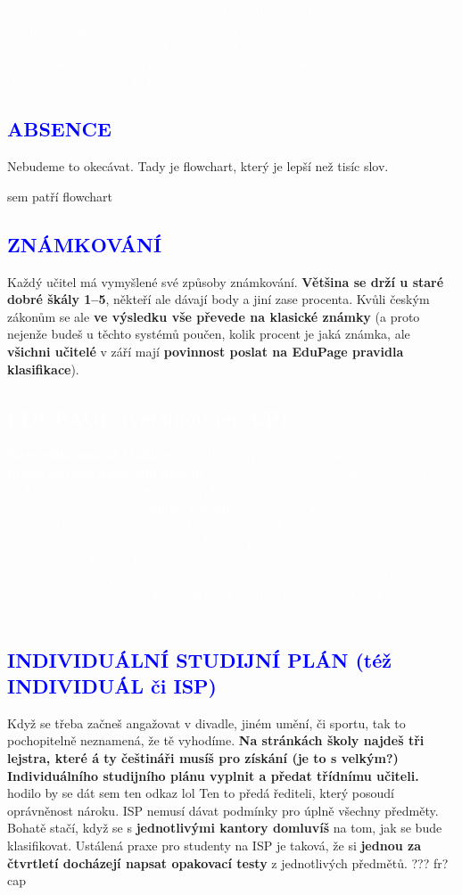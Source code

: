 \documentclass{article}
\newcommand{\podnadpisf}[1]{
  \subsection*{\textcolor{blue}{#1}}
}
\begin{document}
\begin{bluebox}
  \textcolor{white}{\footnotesize
  ‘v jídelně jsme si všichni rovni’ aneb jeden podpultový tip:\\
  v případě úplně nejhoršího scénáře, kdy si zapomeneš objednat jídlo a v burze nic není, můžeš zkusit dojít čtvrt hodiny před druhou a hodit na kuchařky psí oči, třeba ti něco dají. a i když se nevyvede s hlavním chodem, většinou ti dovolí vzít si polívku. (ale od nás to nemáš!)}
\end{bluebox}

\pagebreak
\podnadpisf{ABSENCE}
Nebudeme to okecávat. Tady je flowchart, který je lepší než tisíc slov.

sem patří flowchart

\pagebreak

\podnadpisf{ZNÁMKOVÁNÍ}
Každý učitel má vymyšlené své způsoby známkování. \textbf{Většina se drží u staré dobré škály 1--5}, někteří ale dávají body a jiní zase procenta. Kvůli českým zákonům se ale \textbf{ve výsledku vše převede na klasické známky} (a proto nejenže budeš u těchto  systémů poučen, kolik procent je jaká známka, ale \textbf{všichni učitelé} v září mají \textbf{povinnost poslat na EduPage pravidla klasifikace}).

\begin{bluebox}
\textcolor{white}{\subsection*{EDUPAGE (většinou jen EP)}
\textbf{Naše elektronická třídnice.} Zavedli jsme ji na začátku roku 2020, takže \textbf{prošla doslova zkouškou ohněm} -- a úspěšně (i když to je diskutabilní). Občas na EP nadáváme, ale to snad ani
nejde jinak. \\
Faktem je, že tam najdeš \textbf{úplně všechno} -- rozvrhy, suplování, úkoly, hlasování, známky, absence, prezentace, ... A to všechno na kvadrát. \\
A taky si tam můžeš psát s učiteli. Jedna z prvních věcí by tedy mělo být milostné psaní Gábině Chovancové. \\
Přidat rant o tom jak lze naimportovat rozvrh do google kalendáře. Actually to má být v modrém boxíku, toto celé ne. Je to designová chyba. Boxík je pro poznámky či doplňující informace.
}
\end{bluebox}

\podnadpisf{INDIVIDUÁLNÍ STUDIJNÍ PLÁN (též INDIVIDUÁL či ISP)}
Když se třeba začneš angažovat v divadle, jiném umění, či sportu, tak to pochopitelně neznamená, že tě vyhodíme. \textbf{Na stránkách školy najdeš tři lejstra, které á ty češtináři musíš pro získání (je to s velkým?) Individuálního studijního plánu vyplnit a předat třídnímu učiteli.} hodilo by se dát sem ten odkaz lol Ten to předá řediteli, který posoudí oprávněnost nároku.
ISP nemusí dávat podmínky pro úplně všechny předměty. Bohatě stačí, když se
s \textbf{jednotlivými kantory domluvíš} na tom, jak se bude klasifikovat. Ustálená praxe pro studenty na ISP je taková, že si \textbf{jednou za čtvrtletí docházejí napsat opakovací testy} z jednotlivých předmětů. ??? fr? cap
\end{document}
